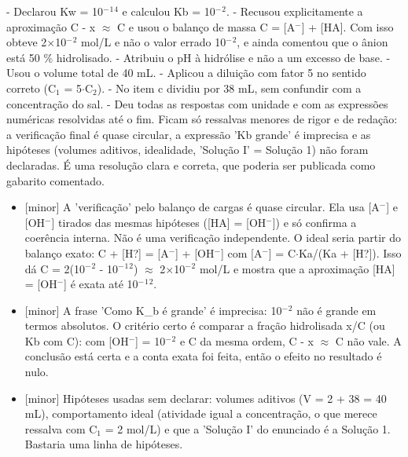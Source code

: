 \documentclass{article}%
\begin{document}
{-} Declarou Kw = 10$^{-}$$^{1}$$^{4}$ e calculou Kb = 10$^{-}$$^2$.\newline%
{-} Recusou explicitamente a aproximação C - x $\approx$ C e usou o balanço de massa C = {[}A$^{-}${]} + {[}HA{]}. Com isso obteve 2$\times$10$^{-}$$^2$ mol/L e não o valor errado 10$^{-}$$^2$, e ainda comentou que o ânion está 50 \% hidrolisado.\newline%
{-} Atribuiu o pH à hidrólise e não a um excesso de base.\newline%
{-} Usou o volume total de 40 mL.\newline%
{-} Aplicou a diluição com fator 5 no sentido correto (C$_{1}$ = 5$\cdot$C$_{2}$).\newline%
{-} No item c dividiu por 38 mL, sem confundir com a concentração do sal.\newline%
{-} Deu todas as respostas com unidade e com as expressões numéricas resolvidas até o fim.\newline%
\newline%
Ficam só ressalvas menores de rigor e de redação: a verificação final é quase circular, a expressão 'Kb grande' é imprecisa e as hipóteses (volumes aditivos, idealidade, 'Solução I' = Solução 1) não foram declaradas. É uma resolução clara e correta, que poderia ser publicada como gabarito comentado.%
\begin{itemize}%
\item%
{[}minor{]} A 'verificação' pelo balanço de cargas é quase circular. Ela usa {[}A$^{-}${]} e {[}OH$^{-}${]} tirados das mesmas hipóteses ({[}HA{]} = {[}OH$^{-}${]}) e só confirma a coerência interna. Não é uma verificação independente. O ideal seria partir do balanço exato: C + {[}H?{]} = {[}A$^{-}${]} + {[}OH$^{-}${]} com {[}A$^{-}${]} = C$\cdot$Ka/(Ka + {[}H?{]}). Isso dá C = 2(10$^{-}$$^2$ - 10$^{-}$$^{1}$$^2$) $\approx$ 2$\times$10$^{-}$$^2$ mol/L e mostra que a aproximação {[}HA{]} = {[}OH$^{-}${]} é exata até 10$^{-}$$^{1}$$^2$.%
\item%
{[}minor{]} A frase 'Como K\_b é grande' é imprecisa: 10$^{-}$$^2$ não é grande em termos absolutos. O critério certo é comparar a fração hidrolisada x/C (ou Kb com C): com {[}OH$^{-}${]} = 10$^{-}$$^2$ e C da mesma ordem, C - x $\approx$ C não vale. A conclusão está certa e a conta exata foi feita, então o efeito no resultado é nulo.%
\item%
{[}minor{]} Hipóteses usadas sem declarar: volumes aditivos (V = 2 + 38 = 40 mL), comportamento ideal (atividade igual a concentração, o que merece ressalva com C$_{1}$ = 2 mol/L) e que a 'Solução I' do enunciado é a Solução 1. Bastaria uma linha de hipóteses.%
\end{itemize}%
\end{document}
